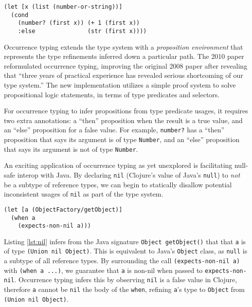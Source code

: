 \documentclass[12pt, a4paper]{article}
\begin{document}
\begin{lstlisting}[caption=A well typed form utilising occurrence typing with Clojure syntax, label=lst:occ1]
(let [x (list (number-or-string))]
  (cond 
    (number? (first x)) (+ 1 (first x))
    :else               (str (first x))))
\end{lstlisting}

Occurrence typing \cite{Tobin-Hochstadt:2008:DIT:1328897.1328486}
\cite{Tobin-Hochstadt:2010:LTU:1932681.1863561} extends the type 
system with a \emph{proposition environment} that represents 
the type refinements inferred down a particular path.
The 2010 paper \cite{Tobin-Hochstadt:2010:LTU:1932681.1863561}
reformulated occurrence typing, improving the original 2008 paper
\cite{Tobin-Hochstadt:2008:DIT:1328897.1328486}
after revealing that ``three years of practical experience has revealed
serious shortcoming of our type system.''\cite{Tobin-Hochstadt:2010:LTU:1932681.1863561}
The new implementation utilizes a simple proof system to solve
propositional logic statements, in terms of type predicates and selectors.

For occurrence typing to infer propositions from type predicate usages, it requires 
two extra annotations: a ``then'' proposition
when the result is a true value, and an ``else'' proposition for a false value.
For example, \lstinline|number?| has a ``then'' proposition that says its argument
is of type \lstinline|Number|, and an ``else'' proposition that says its argument is not of type \lstinline|Number|.

An exciting application of occurrence typing as yet unexplored is facilitating null-safe interop with Java.
By declaring \lstinline|nil| (Clojure's value of Java's \lstinline|null|) to \emph{not} be a subtype of reference types,
we can begin to statically disallow potential inconsistent usages of \lstinline|nil| as part of the type system.

\begin{lstlisting}[caption=Observing nil-checks using occurrence typing, label=lst:nil]
(let [a (ObjectFactory/getObject)]
  (when a
    (expects-non-nil a)))
\end{lstlisting}

Listing \ref{lst:nil} infers from the Java signature \lstinline|Object getObject()| that
that \lstinline|a| is of type \lstinline|(Union nil Object)|. This is equivalent to Java's
\lstinline|Object| class, as \lstinline|null| is a subtype of all reference types. By surrounding
the call \lstinline|(expects-non-nil a)| with \lstinline|(when a ...)|, we guarantee that
\lstinline|a| is non-nil when passed to \lstinline|expects-non-nil|. Occurrence typing infers
this by observing \lstinline|nil| is a false value in Clojure, therefore \lstinline|a| cannot
be \lstinline|nil| the body of the \lstinline|when|, refining \lstinline|a|'s type to \lstinline|Object|
from \lstinline|(Union nil Object)|.
\end{document}
